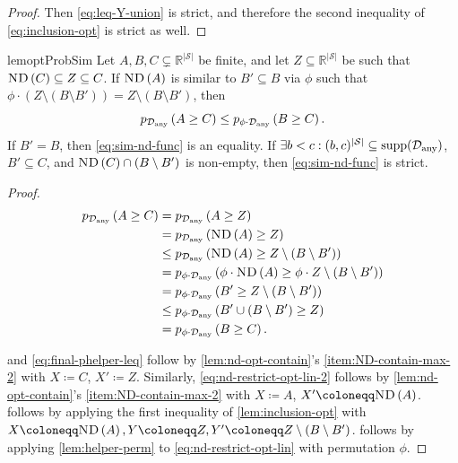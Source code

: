 \documentclass{article}
\renewcommand{\abs}[1]{\left|#1\right|}
\newcommand*{\prn}[1]{\left(#1\right)}
\newcommand*{\defeq}{\coloneqq} %
\newcommand*{\reals}{\mathbb{R}}
\newcommand*{\upsc}[1]{\text{\upshape\textsc{#1}}}
\newcommand*{\St}{\mathcal{S}}
\newcommand*{\rewardVS}{\reals^{\abs{\St}}} %
\newcommand*{\D}{\mathcal{D}} %
\newcommand*{\Dany}{\D_{\text{any}}}
\newcommand*{\ND}[1]{\upsc{ND}\prn{#1}}
\theoremstyle{definition}
\begin{document}
\begin{appendices}
\begin{proof}
Then \cref{eq:leq-Y-union} is strict, and therefore the second inequality of \cref{eq:inclusion-opt} is strict as well.
\end{proof}

\begin{restatable}{lem}{optProbSim}\label{lem:sim-lin-func-opt}
Let $A,B,C\subsetneq \rewardVS$ be finite, and let $Z\subseteq \rewardVS$ be such that $\ND{C}\subseteq Z\subseteq C$. If $\ND{A}$ is similar to $B'\subseteq B$ via $\phi$ such that $\phi\cdot \prn{Z\setminus \prn{B\setminus B'}}=Z\setminus \prn{B\setminus B'}$, then 
\begin{equation}
    \phelper{A\geq C}[\Dany]\leq \phelper{B\geq C}[\phi\cdot \Dany].\label{eq:sim-nd-func}
\end{equation} 
If $B'=B$, then \cref{eq:sim-nd-func} is an equality. If $\exists b<c: (b,c)^{\abs{\St}}\subseteq \supp[\Dany]$, $B'\subseteq C$, and $\ND{C}\cap \prn{B\setminus B'}$ is non-empty, then \cref{eq:sim-nd-func} is strict.
\end{restatable}
\begin{proof}
\begin{align}
    \phelper{A\geq C}[\Dany]&=\phelper{A\geq Z}[\Dany]\label{eq:nd-restrict-opt-lin}\\ 
    &=\phelper{\ND{A}\geq Z}[\Dany]\label{eq:nd-restrict-opt-lin-2}\\
    &\leq \phelper{\ND{A}\geq Z\setminus\prn{B\setminus B'}}[\Dany]\label{eq:fewer-requirements}\\
    &= \phelper{\phi\cdot \ND{A}\geq \phi\cdot Z\setminus\prn{B\setminus B'}}[\phi\cdot \Dany]\label{eq:phi-helper-nd-opt}\\
    &= \phelper{B'\geq Z\setminus\prn{B\setminus B'}}[\phi\cdot \Dany]\label{eq:phi-assumptions}\\
    &\leq \phelper{B'\cup \prn{B\setminus B'}\geq Z}[\phi\cdot \Dany]\label{eq:reunion}\\
    &= \phelper{B\geq C}[\phi\cdot \Dany].\label{eq:final-phelper-leq}
\end{align}

 and \cref{eq:final-phelper-leq} follow by \cref{lem:nd-opt-contain}'s \cref{item:ND-contain-max-2} with $X\defeq C$, $X'\defeq Z$. Similarly, \cref{eq:nd-restrict-opt-lin-2} follows by \cref{lem:nd-opt-contain}'s \cref{item:ND-contain-max-2} with $X\defeq A$, $X'\defeq \ND{A}$.  follows by applying the first inequality of \cref{lem:inclusion-opt} with $X\defeq \ND{A}, Y\defeq Z, Y'\defeq Z\setminus (B\setminus B')$.  follows by applying \cref{lem:helper-perm} to \cref{eq:nd-restrict-opt-lin} with permutation $\phi$. 


\end{proof}
\end{appendices}
\end{document}
